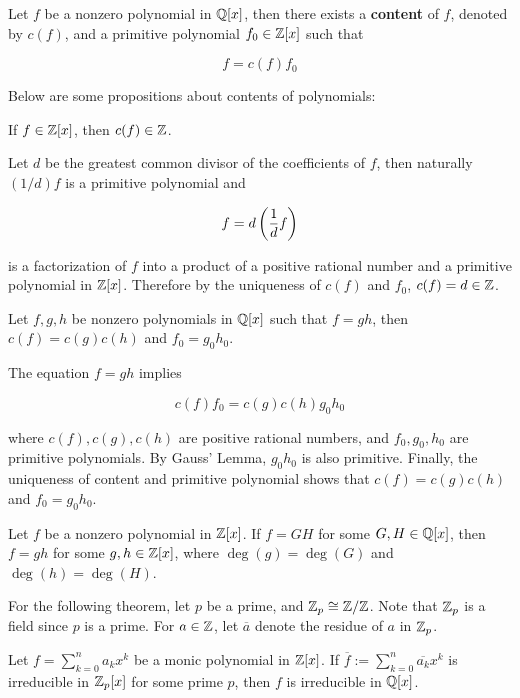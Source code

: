\documentclass[a4paper,12pt]{article}
\begin{document}
\begin{dft}
  Let $f$ be a nonzero polynomial in $\mathbb{Q}[x]$, then there exists a \textbf{content} of $f$, denoted by $c(f)$, and a primitive polynomial $f_{0}\in\mathbb{Z}[x]$ such that

  $$f=c(f)f_{0}$$
\end{dft}\n

Below are some propositions about contents of polynomials:\n

\begin{pst}
  If $f\in\mathbb{Z}[x]$, then $c(f)\in\mathbb{Z}$.\n

  \prf Let $d$ be the greatest common divisor of the coefficients of $f$, then naturally $(1/d)f$ is a primitive polynomial and

  $$f=d\left( \frac{1}{d}f\right)$$\s

  is a factorization of $f$ into a product of a positive rational number and a primitive polynomial in $\mathbb{Z}[x]$. Therefore by the uniqueness of $c(f)$ and $f_{0}$, $c(f)=d\in\mathbb{Z}$.
\end{pst}\n

\begin{pst}
  Let $f,g,h$ be nonzero polynomials in $\mathbb{Q}[x]$ such that $f=gh$, then $c(f)=c(g)c(h)$ and $f_{0}=g_{0}h_{0}$.\n

  \prf The equation $f=gh$ implies

  $$c(f)f_{0}=c(g)c(h)g_{0}h_{0}$$\s

  where $c(f),c(g),c(h)$ are positive rational numbers, and $f_{0},g_{0},h_{0}$ are primitive polynomials. By Gauss' Lemma, $g_{0}h_{0}$ is also primitive. Finally, the uniqueness of content and primitive polynomial shows that $c(f)=c(g)c(h)$ and $f_{0}=g_{0}h_{0}$.
\end{pst}\n

\begin{thm}
  Let $f$ be a nonzero polynomial in $\mathbb{Z}[x]$. If $f=GH$ for some $G,H\in\mathbb{Q}[x]$, then $f=gh$ for some $g,h\in\mathbb{Z}[x]$, where $\deg(g)=\deg(G)$ and $\deg(h)=\deg(H)$.
\end{thm}\n

For the following theorem, let $p$ be a prime, and $\mathbb{Z}_{p}\cong\mathbb{Z}/\mathbb{Z}$. Note that $\mathbb{Z}_{p}$ is a field since $p$ is a prime. For $a\in\mathbb{Z}$, let $\overline{a}$ denote the residue of $a$ in $\mathbb{Z}_{p}$. 

\begin{thm}
  Let $f=\sum_{k=0}^{n}a_{k}x^{k}$ be a monic polynomial in $\mathbb{Z}[x]$. If $\overline{f}:=\sum_{k=0}^{n}\overline{a_{k}}x^{k}$ is irreducible in $\mathbb{Z}_{p}[x]$ for some prime $p$, then $f$ is irreducible in $\mathbb{Q}[x]$.
\end{thm}\n
\end{document}
